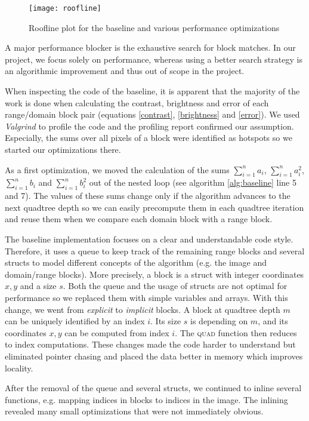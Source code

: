 \begin{figure}
  \texttt{[image: roofline]}
  \caption{Roofline plot for the baseline and various performance optimizations}
  \label{fig:roofline}
\end{figure}

 A major performance blocker is the exhaustive search for block
matches. In our project, we focus solely on performance, whereas using a better
search strategy is an algorithmic improvement and thus out of scope in the
project.

When inspecting the code of the baseline, it is apparent that the majority of
the work is done when calculating the contrast, brightness and error of each
range/domain block pair (equations \ref{contrast}, \ref{brightness} and
\ref{error}). We used \textit{Valgrind} \cite{valgrind} to profile the code and
the profiling report confirmed our assumption. Especially, the sums over all
pixels of a block were identified as hotspots so we started our optimizations
there.

 As a first optimization, we moved the calculation of the sums $\sum_{i=1}^n a_i$,
$\sum_{i=1}^n a_i^2$, $\sum_{i=1}^n b_i$ and $\sum_{i=1}^n b_i^2$ out of the nested loop
(see algorithm \ref{alg:baseline} line 5 and 7). The values of these sums change only if the algorithm advances
to the next quadtree depth so we can easily precompute them in each quadtree iteration and reuse them when we
compare each domain block with a range block.

The baseline implementation focuses on a clear and understandable code style. Therefore, it uses a queue
to keep track of the remaining range blocks and several structs to model different concepts of the algorithm
(e.g. the image and domain/range blocks). More precisely, a block is a struct with integer coordinates $x,y$ and a size $s$.
Both the queue and the usage of structs are not optimal for performance so we replaced them
with simple variables and arrays. With this change, we went from \textit{explicit} to \textit{implicit} blocks.
A block at quadtree depth $m$ can be uniquely identified by an index $i$. Its size $s$ is depending on $m$,
and its coordinates $x,y$ can be computed from index $i$. The \textsc{quad} function then reduces to index computations.
These changes made the code harder to understand but eliminated pointer chasing and placed the
data better in memory which improves locality.

After the removal of the queue and several structs, we continued to inline several functions, e.g. mapping indices in blocks
to indices in the image. The inlining revealed many small optimizations that were not immediately obvious.

